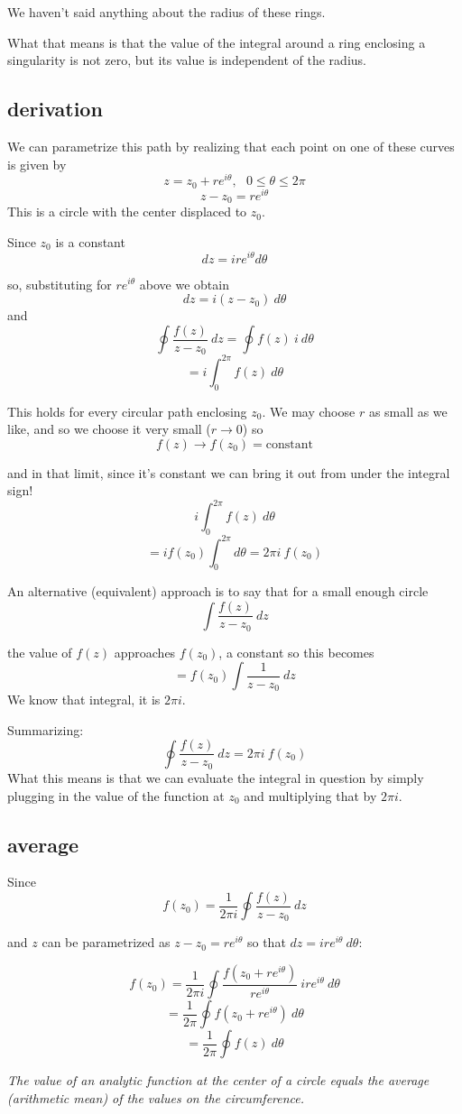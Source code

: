 \documentclass[11pt, oneside]{article}
\begin{document}
We haven't said anything about the radius of these rings.  

What that means is that the value of the integral around a ring enclosing a singularity is not zero, but its value is independent of the radius.

\subsection*{derivation}

We can parametrize this path by realizing that each point on one of these curves is given by
\[ z = z_0 + r e^{i\theta}, \ \ \ 0 \le \theta \le 2 \pi \]
\[ z - z_0 = r e^{i\theta} \]
This is a circle with the center displaced to $z_0$.

Since $z_0$ is a constant
\[ dz = i r e^{i \theta} d \theta \]

so, substituting for $r e^{i\theta}$ above we obtain
\[ dz = i(z - z_0) \ d \theta \]
and
\[ \oint \frac{f(z)}{z - z_0} \ dz = \oint f(z) \ i \ d \theta \]
\[ = i \int_0^{2\pi}  f(z) \ d \theta \]

This holds for every circular path enclosing $z_0$.  We may choose $r$ as small as we like, and so we choose it very small ($r \rightarrow 0$) so
\[ f(z) \rightarrow f(z_0) = \text{constant} \]

and in that limit, since it's constant we can bring it out from under the integral sign!
\[ i \int_0^{2\pi}  f(z) \ d \theta \]
\[ = i f(z_0) \int_0^{2\pi} d \theta = 2 \pi i \ f(z_0) \]

An alternative (equivalent) approach is to say that for a small enough circle
\[ \int \frac{f(z)}{z - z_0} \ dz \]

the value of $f(z)$ approaches $f(z_0)$, a constant so this becomes
\[ = f(z_0) \int \frac{1}{z - z_0} \ dz \]
We know that integral, it is $2 \pi i$.

Summarizing:
\[ \oint \frac{f(z)}{z - z_0} \ dz = 2 \pi i \ f(z_0) \]
What this means is that we can evaluate the integral in question by simply plugging in the value of the function at $z_0$ and multiplying that by $2 \pi i$.

\subsection*{average}
Since
\[ f(z_0) = \frac{1}{2 \pi i} \oint \frac{f(z)}{z - z_0} \ dz \]

and $z$ can be parametrized as $z - z_0 = re^{i \theta}$ so that $dz = i r e^{i \theta} \ d \theta$:

\[ f(z_0) = \frac{1}{2 \pi i} \oint \frac{f(z_0 + re^{i \theta})}{re^{i \theta} } \ i r e^{i \theta} \ d \theta \]
\[ = \frac{1}{2 \pi} \oint f(z_0 + re^{i \theta}) \ d \theta \]
\[ = \frac{1}{2 \pi} \oint f(z) \ d \theta \]

\emph{The value of an analytic function at the center of a circle equals the average (arithmetic mean) of the values on the circumference.}
\end{document}
